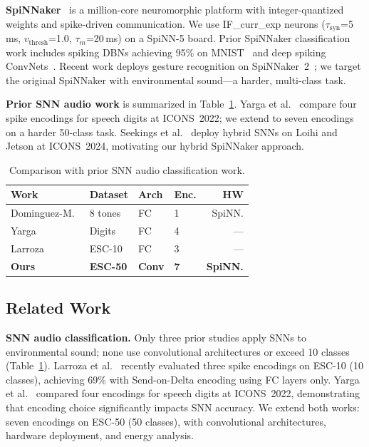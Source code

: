 \documentclass[sigconf,nonacm=false]{acmart}
\begin{document}
\textbf{SpiNNaker}~\cite{furber2014} is a million-core neuromorphic platform with integer-quantized weights and spike-driven communication.
We use IF\_curr\_exp neurons ($\tau_\text{syn}$=5\,ms, $v_\text{thresh}$=1.0, $\tau_m$=20\,ms) on a SpiNN-5 board.
Prior SpiNNaker classification work includes spiking DBNs achieving 95\% on MNIST~\cite{stromatias2015} and deep spiking ConvNets~\cite{patino2020}.
Recent work deploys gesture recognition on SpiNNaker~2~\cite{arfa2025}; we target the original SpiNNaker with environmental sound---a harder, multi-class task.

\textbf{Prior SNN audio work} is summarized in Table~\ref{tab:comparison}.
Yarga et al.~\cite{yarga2022} compare four spike encodings for speech digits at ICONS~2022; we extend to seven encodings on a harder 50-class task.
Seekings et al.~\cite{seekings2024} deploy hybrid SNNs on Loihi and Jetson at ICONS~2024, motivating our hybrid SpiNNaker approach.

\begin{table}[t]
\caption{Comparison with prior SNN audio classification work.}
\label{tab:comparison}
\small
\begin{tabular}{@{}p{1.8cm}lllr@{}}
\toprule
Work & Dataset & Arch & Enc. & HW \\
\midrule
Dominguez-M.\ \cite{dominguez2016} & 8 tones & FC & 1 & SpiNN. \\
Yarga \cite{yarga2022} & Digits & FC & 4 & --- \\
Larroza \cite{larroza2025} & ESC-10 & FC & 3 & --- \\
\textbf{Ours} & \textbf{ESC-50} & \textbf{Conv} & \textbf{7} & \textbf{SpiNN.} \\
\bottomrule
\end{tabular}
\end{table}

\subsection{Related Work}

\textbf{SNN audio classification.}
Only three prior studies apply SNNs to environmental sound; none use convolutional architectures or exceed 10 classes (Table~\ref{tab:comparison}).
Larroza et al.~\cite{larroza2025} recently evaluated three spike encodings on ESC-10 (10 classes), achieving 69\% with Send-on-Delta encoding using FC layers only.
Yarga et al.~\cite{yarga2022} compared four encodings for speech digits at ICONS~2022, demonstrating that encoding choice significantly impacts SNN accuracy.
We extend both works: seven encodings on ESC-50 (50 classes), with convolutional architectures, hardware deployment, and energy analysis.
\end{document}

